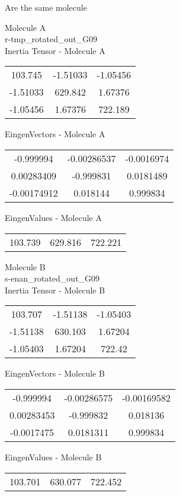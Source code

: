 \begin{center}
\vtab
\vtab
\textcolor{NavyBlue}{\Large Are the same molecule}
\end{center}
\newpage
\begin{multicols}{2}
\begin{center}
Molecule A \\ 
r-tmp\_rotated\_out\_G09
\\
Inertia Tensor - Molecule A \\
\vtab
\begin{tabular}{|c c c|}
103.745	 & 	-1.51033	 & 	-1.05456	 \\
-1.51033	 & 	629.842	 & 	1.67376	 \\
-1.05456	 & 	1.67376	 & 	722.189
\end{tabular}

\vtab
 EingenVectors - Molecule A     \\
\vtab
\begin{tabular}{|c c c|}
-0.999994	 & 	-0.00286537	 & 	-0.0016974	 \\
0.00283409	 & 	-0.999831	 & 	0.0181489	 \\
-0.00174912	 & 	0.018144	 & 	0.999834
\end{tabular}

\vtab
 EingenValues - Molecule A     \\
\vtab
\begin{tabular}{|c c c|}
103.739	 & 	629.816	 & 	722.221
\end{tabular}
\columnbreak

Molecule B \\ 
s-enan\_rotated\_out\_G09
\\
Inertia Tensor - Molecule B \\
\vtab
\begin{tabular}{|c c c|}
103.707	 & 	-1.51138	 & 	-1.05403	 \\
-1.51138	 & 	630.103	 & 	1.67204	 \\
-1.05403	 & 	1.67204	 & 	722.42
\end{tabular}

\vtab
 EingenVectors - Molecule B     \\
\vtab
\begin{tabular}{|c c c|}
-0.999994	 & 	-0.00286575	 & 	-0.00169582	 \\
0.00283453	 & 	-0.999832	 & 	0.018136	 \\
-0.0017475	 & 	0.0181311	 & 	0.999834
\end{tabular}

\vtab
 EingenValues - Molecule B     \\
\vtab
\begin{tabular}{|c c c|}
103.701	 & 	630.077	 & 	722.452
\end{tabular}

\end{center}
\end{multicols}
